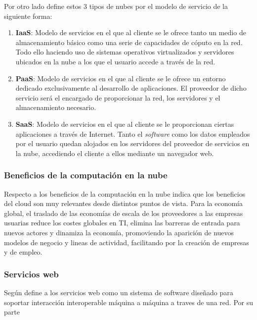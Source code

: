 Por otro lado \cite{msolutions} define estos 3 tipos de nubes por el modelo de servicio
de la siguiente forma:
\begin{enumerate}
    \item \textbf{IaaS}: Modelo de servicios en el que al cliente se le ofrece tanto un
          medio de almacenamiento b\'asico como una serie de capacidades de c\'oputo en la red.
          Todo ello haciendo uso de sistemas operativos virtualizados y servidores ubicados
          en la nube a los que el usuario accede a trav\'es de la red.
    \item \textbf{PaaS}: Modelo de servicios en el que al cliente se le ofrece un entorno
          dedicado exclusivamente al desarrollo de aplicaciones. El proveedor de dicho servicio ser\'a
          el encargado de proporcionar la red, los servidores y el almacenamiento necesario.
    \item \textbf{SaaS}: Modelo de servicios en el que al cliente se le proporcionan ciertas aplicaciones
          a trav\'es de Internet. Tanto el \emph{software} como los datos empleados por el usuario
          quedan alojados en los servidores del proveedor de servicios en la nube, accediendo el cliente
          a ellos mediante un navegador web.
\end{enumerate}
\subsubsection{Beneficios de la computaci\'on en la nube}
Respecto a los beneficios de la computaci\'on en la nube \cite{cierco} indica que los beneficios
del cloud son muy relevantes desde distintos puntos de vista.
Para la econom\'ia global, el traslado de las econom\'ias de escala de los
proveedores a las empresas usuarias reduce los costes globales en TI, elimina
las barreras de entrada para nuevos actores y dinamiza la econom\'ia, promoviendo
la aparici\'on de nuevos modelos de negocio y lineas de actividad, facilitando
por la creaci\'on de empresas y de empleo.
\subsubsection{Servicios web}

Seg\'un \cite{w3c} define a los servicios web como un sistema de software dise\~nado
para soportar interacci\'on interoperable m\'aquina a m\'aquina a traves de una red.
Por su parte

